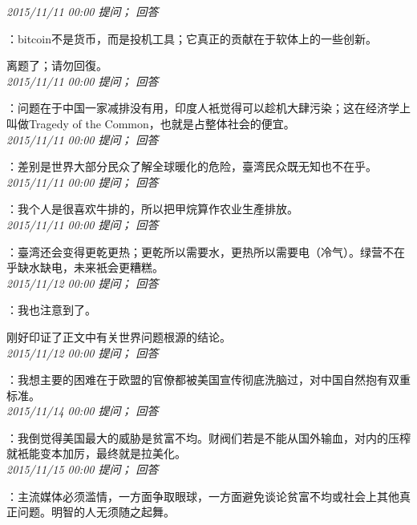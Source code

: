 \documentclass[twocolumn]{ctexart}
\begin{document}
\textit{\hfill\noindent\small 2015/11/11 00:00 提问； 回答}

：bitcoin不是货币，而是投机工具；它真正的贡献在于软体上的一些创新。

离题了；请勿回復。\\

\textit{\hfill\noindent\small 2015/11/11 00:00 提问； 回答}

：问题在于中国一家减排没有用，印度人衹觉得可以趁机大肆污染；这在经济学上叫做Tragedy of the Common，也就是占整体社会的便宜。\\

\textit{\hfill\noindent\small 2015/11/11 00:00 提问； 回答}

：差别是世界大部分民众了解全球暖化的危险，臺湾民众既无知也不在乎。\\

\textit{\hfill\noindent\small 2015/11/11 00:00 提问； 回答}

：我个人是很喜欢牛排的，所以把甲烷算作农业生產排放。\\

\textit{\hfill\noindent\small 2015/11/11 00:00 提问； 回答}

：臺湾还会变得更乾更热；更乾所以需要水，更热所以需要电（冷气）。绿营不在乎缺水缺电，未来衹会更糟糕。\\

\textit{\hfill\noindent\small 2015/11/12 00:00 提问； 回答}

：我也注意到了。

刚好印证了正文中有关世界问题根源的结论。\\

\textit{\hfill\noindent\small 2015/11/12 00:00 提问； 回答}

：我想主要的困难在于欧盟的官僚都被美国宣传彻底洗脑过，对中国自然抱有双重标准。\\

\textit{\hfill\noindent\small 2015/11/14 00:00 提问； 回答}

：我倒觉得美国最大的威胁是贫富不均。财阀们若是不能从国外输血，对内的压榨就衹能变本加厉，最终就是拉美化。\\

\textit{\hfill\noindent\small 2015/11/15 00:00 提问； 回答}

：主流媒体必须滥情，一方面争取眼球，一方面避免谈论贫富不均或社会上其他真正问题。明智的人无须随之起舞。\\
\end{document}

